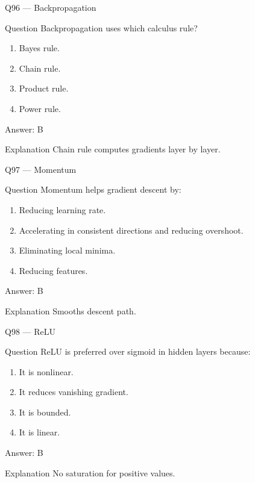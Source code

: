 \documentclass[aspectratio=169,8pt]{beamer}
\begin{document}
	\begin{frame}{Q96 --- Backpropagation}
		\begin{block}{Question}
			Backpropagation uses which calculus rule?
		\end{block}
		\begin{enumerate}
			\item Bayes rule.
			\item Chain rule.
			\item Product rule.
			\item Power rule.
		\end{enumerate}
		\begin{exampleblock}{Answer: B}\end{exampleblock}
		\begin{block}{Explanation}
			Chain rule computes gradients layer by layer.
		\end{block}
	\end{frame}
	
	\begin{frame}{Q97 --- Momentum}
		\begin{block}{Question}
			Momentum helps gradient descent by:
		\end{block}
		\begin{enumerate}
			\item Reducing learning rate.
			\item Accelerating in consistent directions and reducing overshoot.
			\item Eliminating local minima.
			\item Reducing features.
		\end{enumerate}
		\begin{exampleblock}{Answer: B}\end{exampleblock}
		\begin{block}{Explanation}
			Smooths descent path.
		\end{block}
	\end{frame}
	
	\begin{frame}{Q98 --- ReLU}
		\begin{block}{Question}
			ReLU is preferred over sigmoid in hidden layers because:
		\end{block}
		\begin{enumerate}
			\item It is nonlinear.
			\item It reduces vanishing gradient.
			\item It is bounded.
			\item It is linear.
		\end{enumerate}
		\begin{exampleblock}{Answer: B}\end{exampleblock}
		\begin{block}{Explanation}
			No saturation for positive values.
		\end{block}
	\end{frame}
	
\end{document}
